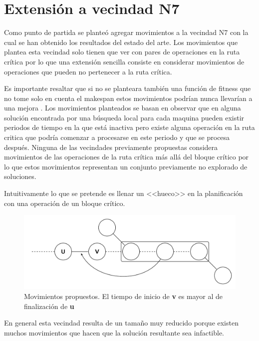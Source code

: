 \section{Extensión a vecindad N7}
Como punto de partida se planteó agregar movimientos a la vecindad N7 con la cual se han obtenido los resultados del estado del arte.
Los movimientos que plantea esta vecindad solo tienen que ver con pares de operaciones en la ruta crítica por lo que una extensión sencilla consiste en considerar movimientos de operaciones que pueden no pertenecer a la ruta crítica.

Es importante resaltar que si no se planteara también una función de fitness que no tome solo en cuenta el makespan estos movimientos podrían nunca llevarían a una mejora \cite{blazewicz1996job}. 
Los movimientos planteados se basan en observar que en alguna solución encontrada por una búsqueda local para cada maquina pueden existir periodos de tiempo en la que está inactiva pero existe alguna operación en la ruta critica que podría comenzar a procesarse en este periodo y que se procesa después. Ninguna de las vecindades previamente propuestas considera movimientos de las operaciones de la ruta crítica más allá del bloque crítico por lo que estos movimientos representan un conjunto previamente no explorado de soluciones.

Intuitivamente lo que se pretende es llenar un <<hueco>> en la planificación con una operación de un bloque crítico.

\begin{figure}[H]
\centering
\includegraphics[scale=.7]{Imagenes/N8.pdf}
    \caption{Movimientos propuestos. El tiempo de inicio de \textbf{v} es mayor al de finalización de \textbf{u}}
\end{figure}

En general esta vecindad resulta de un tamaño muy reducido porque existen muchos movimientos que hacen que la solución resultante sea infactible. 
